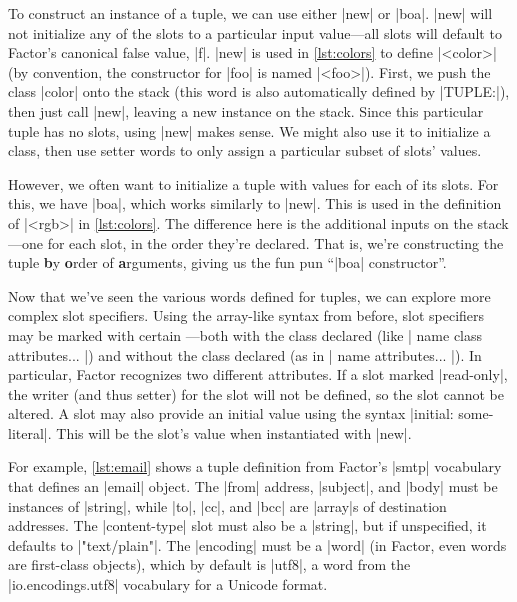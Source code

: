 To construct an instance of a tuple, we can use either \factor|new| or
\factor|boa|.  \factor|new| will not initialize any of the slots to a
particular input value---all slots will default to Factor's canonical false
value, \factor|f|.  \factor|new| is used in \cref{lst:colors} to define
\factor|<color>| (by convention, the constructor for \factor|foo| is named
\factor|<foo>|).  First, we push the class \factor|color| onto the stack (this
word is also automatically defined by \factor|TUPLE:|), then just call
\factor|new|, leaving a new instance on the stack.  Since this particular tuple
has no slots, using \factor|new| makes sense.  We might also use it to
initialize a class, then use setter words to only assign a particular subset of
slots' values.

However, we often want to initialize a tuple with values for each of its slots.
For this, we have \factor|boa|, which works similarly to \factor|new|.  This is
used in the definition of \factor|<rgb>| in \cref{lst:colors}.  The difference
here is the additional inputs on the stack---one for each slot, in the order
they're declared.  That is, we're constructing the tuple \textbf{b}y
\textbf{o}rder of \textbf{a}rguments, giving us the fun pun ``\factor|boa|
constructor''.


Now that we've seen the various words defined for tuples, we can explore more
complex slot specifiers.  Using the array-like syntax from before, slot
specifiers may be marked with certain ---both with the class
declared (like
%
\factor|{ name class attributes... }|)
%
and without the class declared (as in 
%
\factor|{ name attributes... }|).
%
In particular, Factor recognizes two different attributes.  If a slot marked
\factor|read-only|, the writer (and thus setter) for the slot will not be
defined, so the slot cannot be altered.  A slot may also provide an initial
value using the syntax \factor|initial: some-literal|.  This will be the slot's
value when instantiated with \factor|new|. 

For example, \cref{lst:email} shows a tuple definition from Factor's
\factor|smtp| vocabulary that defines an \factor|email| object.  The
\factor|from| address, \factor|subject|, and \factor|body| must be instances of
\factor|string|, while \factor|to|, \factor|cc|, and \factor|bcc| are
\factor|array|s of destination addresses.  The \factor|content-type| slot must
also be a \factor|string|, but if unspecified, it defaults to
\factor|"text/plain"|.  The \factor|encoding| must be a \factor|word| (in
Factor, even words are first-class objects), which by default is \factor|utf8|,
a word from the \factor|io.encodings.utf8| vocabulary for a Unicode format.


